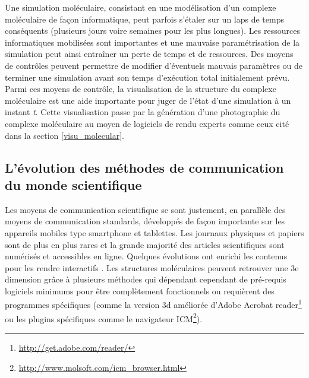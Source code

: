 Une simulation moléculaire, consistant en une modélisation d'un complexe moléculaire de façon informatique, peut parfois s'étaler sur un laps de temps conséquents (plusieurs jours voire semaines pour les plus longues). Les ressources informatiques mobilisées sont importantes et une mauvaise paramétrisation de la simulation peut ainsi entraîner un perte de temps et de ressources. Des moyens de contrôles peuvent permettre de modifier d'éventuels mauvais paramètres ou de terminer une simulation avant son temps d'exécution total initialement prévu. Parmi ces moyens de contrôle, la visualisation de la structure du complexe moléculaire est une aide importante pour juger de l'état d'une simulation à un instant \textit{t}.
Cette visualisation passe par la génération d'une photographie du complexe moléculaire au moyen de logiciels de rendu experts comme ceux cité dans la section \ref{visu_molecular}.


\subsection{L'évolution des méthodes de communication du monde scientifique}

Les moyens de communication scientifique se sont justement, en parallèle des moyens de communication standards, développés de façon importante sur les appareils mobiles type smartphone et tablettes. Les journaux physiques et papiers sont de plus en plus rares et la grande majorité des articles scientifiques sont numérisés et accessibles en ligne. %
Quelques évolutions ont enrichi les contenus pour les rendre interactifs \cite{attwood2010utopia}. Les structures moléculaires peuvent retrouver une 3e dimension grâce à plusieurs méthodes \cite{kumar2008grasping,raush2009new} qui dépendant cependant de pré-requis logiciels minimums pour être complètement fonctionnels ou requièrent des programmes spécifiques (comme la version 3d améliorée d'Adobe Acrobat reader\footnote{\url{http://get.adobe.com/reader/}} ou les plugins spécifiques comme le navigateur ICM\footnote{\url{http://www.molsoft.com/icm_browser.html}}).

